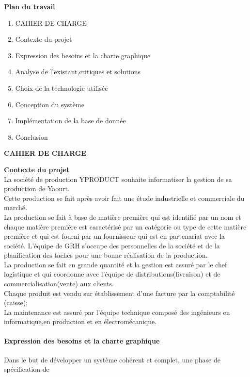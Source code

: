 \documentclass[12pt, openany]{report}
\begin{document}
\begin{center}
\textbf{Plan du travail}
\end{center}
\begin{enumerate}
\item CAHIER DE CHARGE
\item Contexte du projet
\item Expression des besoins et la charte graphique
\item Analyse de l’existant,critiques et solutions
\item Choix de la technologie utilisée
\item Conception du système
\item Implémentation de la base de donnée
\item Conclusion
\end{enumerate}
\newpage
\begin{center}
\textbf{CAHIER DE CHARGE}\\
\end{center}
\textbf{Contexte du projet}\\
La société  de production YPRODUCT souhaite informatiser la gestion de sa production de Yaourt. \\
Cette production se fait après avoir fait une étude industrielle et commerciale du marché.\\
La production se fait à base de matière première qui est identifié par un nom et chaque matière première est caractérisé par un catégorie ou type de cette matière première et qui est fourni par un fournisseur qui est en partenariat avec la société.
L’équipe de GRH s’occupe des personnelles de la société et de la planification des taches pour une bonne réalisation de la production.\\
La production se fait en grande quantité et la gestion est assuré par le chef logistique et  qui coordonne avec l’équipe de distributions(livraison) et de commercialisation(vente) aux clients.\\
Chaque produit est vendu sur établissement d’une facture par la comptabilité (caisse);\\
La maintenance est assuré par l’équipe technique composé des ingénieurs en informatique,en production et en électromécanique.\\
\\
\textbf{Expression des besoins et la charte graphique}\\
\\
Dans le but de développer un système cohérent et complet, une phase de spécification de
\end{document}
